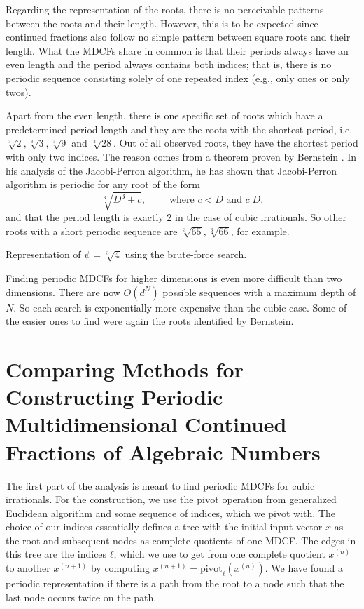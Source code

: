 Regarding the representation of the roots,
there is no perceivable patterns between the roots and their length.
However, this is to be expected since continued fractions also follow no simple
pattern between square roots and their length.
What the MDCFs share in common is that their periods always have an even length
and the period always contains both indices;
that is, there is no periodic sequence consisting solely of one repeated index
(e.g., only ones or only twos).

Apart from the even length, there is one specific set of roots which have a
predetermined period length
and they are the roots with the shortest period, i.e. $\sqrt[3]{2},
\sqrt[3]{3}, \sqrt[3]{9}$ and $\sqrt[3]{28}$.
Out of all observed roots, they have the shortest period with only two indices.
The reason comes from a theorem proven by Bernstein \cite{Bernstein71}.
In his analysis of the Jacobi-Perron algorithm,
he has shown that Jacobi-Perron algorithm is periodic for any root of the form
\[
  \sqrt[3]{D^3 + c}, \qquad \text{ where } c < D \text{ and } c|D.
\]
and that the period length is exactly $2$ in the case of cubic irrationals.
So other roots with a short periodic sequence are $\sqrt[3]{65}, \sqrt[3]{66}$,
for example.

\begin{table}[tbp]
  \caption{Representation of $ψ = \sqrt[3]{4}$ using the brute-force search.}
  \label{table:cube-root-4}
  \centering
  \footnotesize
  
\end{table}

Finding periodic MDCFs for higher dimensions is even more difficult than two dimensions.
There are now $O(d^N)$ possible sequences with a maximum depth of $N$.
So each search is exponentially more expensive than the cubic case.
Some of the easier ones to find were again the roots identified by Bernstein.
\fi

\section{Comparing Methods for Constructing Periodic Multidimensional Continued Fractions of Algebraic Numbers}

The first part of the analysis is meant to find periodic MDCFs for cubic
irrationals.
For the construction, we use the $\mathrm{pivot}$ operation from generalized
Euclidean algorithm and some sequence of indices, which we pivot with.
The choice of our indices essentially defines a tree
with the initial input vector $x$ as the root
and subsequent nodes as complete quotients of one MDCF.
The edges in this tree are the indices $ℓ$, which we use to get from one
complete quotient $x^{(n)}$ to another $x^{(n+1)}$ by computing $x^{(n+1)} =
\mathrm{pivot}_ℓ(x^{(n)})$.
We have found a periodic representation if there is a path from the root to a
node such that the last node occurs twice on the path.

